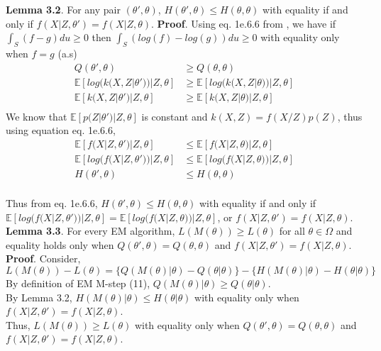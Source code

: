 \textbf{Lemma 3.2}. For any pair $(\theta', \theta)$, $H(\theta', \theta) \leq H(\theta, \theta)$ with equality if and only if $f(X|Z, \theta') = f(X|Z, \theta)$. 
\textbf{Proof}. Using eq. 1e.6.6 from \cite{rao1973linear}, we have if $\int_S(f - g) du \geq 0$ then $\int_S(log(f) - log(g)) du \geq 0$ with equality only when $f = g$ (a.s)
\begin{align*}
	Q(\theta',\theta) &\geq Q(\theta,\theta)\\
	\mathbb{E}[log(k(X,Z|\theta'))|Z, \theta] &\geq \mathbb{E}[log(k(X,Z| \theta))|Z, \theta]\\
	\mathbb{E}[k(X,Z|\theta')|Z, \theta] &\geq \mathbb{E}[k(X,Z| \theta)|Z, \theta]\\
\end{align*}
We know that  $\mathbb{E}[p(Z|\theta')|Z, \theta]$ is constant and $k(X,Z) = f(X/Z)p(Z)$, thus using equation eq. 1e.6.6, 
\begin{align*}
	\mathbb{E}[f(X|Z,\theta')|Z, \theta] &\leq \mathbb{E}[f(X|Z, \theta)|Z, \theta]\\
	\mathbb{E}[log(f(X|Z,\theta'))|Z, \theta] &\leq \mathbb{E}[log(f(X|Z, \theta))|Z, \theta]\\
	H(\theta',\theta) &\leq H(\theta,\theta)\\
\end{align*}

Thus from eq. 1e.6.6, $H(\theta', \theta) \leq H(\theta, \theta)$ with equality if and only if $\mathbb{E}[log(f(X|Z,\theta'))|Z, \theta] = \mathbb{E}[log(f(X|Z, \theta))|Z, \theta]$, or $f(X|Z, \theta') = f(X|Z, \theta)$.\\

\textbf{Lemma 3.3}. For every EM algorithm, $L(M(\theta)) \geq L(\theta)$ for all  $\theta \in \Omega$ and equality holds only when $Q(\theta',\theta) = Q(\theta,\theta)$ and $f(X|Z, \theta') = f(X|Z, \theta)$.\\
\textbf{Proof}. Consider, $L(M(\theta)) - L(\theta) = \{Q(M(\theta)|\theta) - Q(\theta|\theta) \} - \{ H(M(\theta)|\theta) - H(\theta|\theta) \}$
By definition of EM M-step (11), $Q(M(\theta)|\theta) \geq Q(\theta|\theta)$. \\
By Lemma 3.2, $H(M(\theta)|\theta) \leq H(\theta|\theta)$ with equality only when $f(X|Z, \theta') = f(X|Z, \theta)$. \\
Thus, $L(M(\theta)) \geq L(\theta)$ with equality only when $Q(\theta',\theta) = Q(\theta,\theta)$ and $f(X|Z, \theta') = f(X|Z, \theta)$.\\

